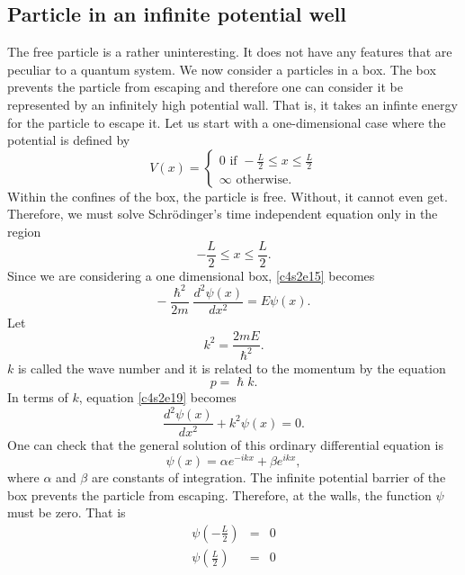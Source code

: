 \subsection{Particle in an infinite potential well}
The free particle is a rather uninteresting. It does not have any features that
are peculiar to a quantum system. We now consider a particles in a box. The box 
prevents the particle from escaping and therefore one can consider it be 
represented by an infinitely high potential wall. That is, it takes an infinte
energy for the particle to escape it. Let us start with a one-dimensional case
where the potential is defined by
\begin{equation}\label{c4s2e18}
V(x) = \begin{cases}
0 \text{ if } -\frac{L}{2} \le x \le \frac{L}{2} \\
\infty \text{ otherwise.}
\end{cases}
\end{equation}
Within the confines of the box, the particle is free. Without, it cannot even 
get. Therefore, we must solve  Schr\"{o}dinger's time independent equation only
in the region
\[
-\frac{L}{2} \le x \le \frac{L}{2}.
\]
Since we are considering a one dimensional box, \eqref{c4s2e15} becomes
\begin{equation}\label{c4s2e19}
-\frac{\hslash^2}{2m}\frac{d^2\psi(x)}{dx^2} = E\psi(x).
\end{equation}
Let
\begin{equation}\label{c4s2e20}
k^2 = \frac{2mE}{\hslash^2}.
\end{equation}
$k$ is called the wave number and it is related to the momentum by the equation
\begin{equation}\label{c4s2e21}
p = \hslash k.
\end{equation}
In terms of $k$, equation \eqref{c4s2e19} becomes
\begin{equation}\label{c4s2e22}
\frac{d^2\psi(x)}{dx^2} + k^2\psi(x) = 0.
\end{equation}
One can check that the general solution of this ordinary differential equation 
is
\begin{equation}\label{c4s2e23}
\psi(x) = \alpha e^{-ikx} + \beta e^{ikx},
\end{equation}
where $\alpha$ and $\beta$ are constants of integration. The infinite potential
barrier of the box prevents the particle from escaping. Therefore, at the walls,
the function $\psi$ must be zero. That is
\begin{eqnarray}
\psi\left(-\frac{L}{2}\right) &=& 0 \label{c4s2e24} \\
\psi\left(\frac{L}{2}\right) &=& 0 \label{c4s2e25}
\end{eqnarray}
